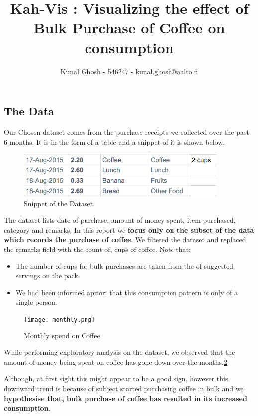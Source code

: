 \documentclass[a4paper,11pt]{article}
\begin{document}
\title{Kah-Vis : Visualizing the effect of 
	Bulk Purchase of Coffee on consumption} %
\author{Kunal Ghosh - 546247 - kunal.ghosh@aalto.fi} %
\maketitle
\begin{multicols}{2}
\section*{The Data}
Our Chosen dataset comes from the purchase receipts we collected over the past 6 months. It is in the form of a table and a snippet of it is shown below.
\begin{figure}
	\includegraphics[width=\linewidth]{fig1.png}
	\caption{Snippet of the Dataset.}
	\label{fig1}
\end{figure}
The dataset lists date of purchase, amount of money spent, item purchased, category and remarks.  In this report we \textbf{focus only on the subset of the data which records the purchase of coffee}. We filtered the dataset and replaced the remarks field with the count of, cups of coffee. Note that:
\begin{itemize}
\item The number of cups for bulk purchases are taken from the of suggested servings on the pack.
\item We had been informed apriori that this consumption pattern is only of a single person.
\end{itemize}

\begin{figure}
	\texttt{[image: monthly.png]}
	\caption{Monthly spend on Coffee}
	\label{fig2}
\end{figure}
While performing exploratory analysis on the dataset, we observed that the amount of money being spent on coffee has gone down over the months.\ref{fig2}

Although, at first sight this might appear to be a good sign, however this downward trend is because of subject started purchasing coffee in bulk and we \textbf{hypothesise that, bulk purchase of coffee has resulted in its increased consumption}. 


\end{multicols}
\end{document}
